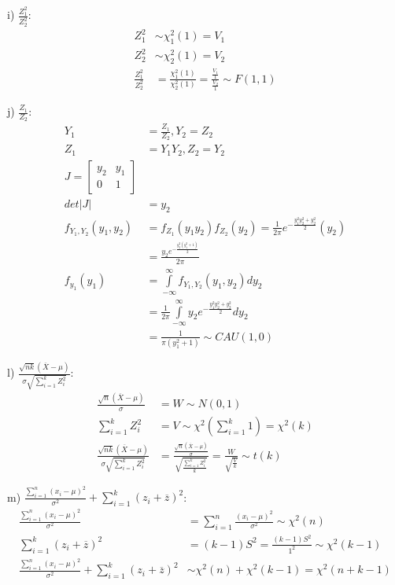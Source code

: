 i) $\frac{Z^2_1}{Z^2_2}$:
\begin{align*}
Z^2_1 &\sim \chi^2_1(1) = V_1 \\
Z^2_2 &\sim \chi^2_2(1) = V_2 \\
\frac{Z^2_1}{Z^2_2} &= \frac{\chi^2_1(1)}{\chi^2_2(1)} = \frac{\frac{V_1}{1}}{\frac{V_2}{1}} \sim F(1, 1)
\end{align*}

j) $\frac{Z_1}{Z_2}$:
\begin{align*}
Y_1 &= \frac{Z_1}{Z_2}, Y_2 = Z_2 \\
Z_1 &= Y_1 Y_2, Z_2 = Y_2 \\
J=\left[
\begin{matrix}
y_2  & y_1 \\
0     & 1
\end{matrix}
\right] \\
det |J| &= y_2 \\
f_{Y_1, Y_2}(y_1, y_2) &= f_{Z_1}(y_1 y_2) f_{Z_2}(y_2) = \frac{1}{2 \pi} e^{-\frac{y^2_1 y^2_2 + y^2_2}{2}} (y_2) \\
  &= \frac{y_2 e^{-\frac{y^2_2(y^2_1 + 1)}{2}}}{2 \pi} \\
f_{y_1}(y_1) &= \int\limits^{\infty}_{-\infty} f_{Y_1, Y_2}(y_1, y_2) dy_2 \\
  &= \frac{1}{2 \pi} \int\limits^{\infty}_{-\infty} y_2 e^{-\frac{y^2_1 y^2_2 + y^2_2}{2}} dy_2 \\
  &= \frac{1}{\pi \left(y^2_1 + 1\right)} \sim CAU(1, 0)
\end{align*}

l) $\frac{\sqrt{nk}\left(\overline{X}-\mu\right)}{\sigma \sqrt{\sum\limits^k_{i=1} Z^2_i}}$:
\begin{align*}
\frac{\sqrt{n}\left(\overline{X}-\mu\right)}{\sigma} &= W \sim N(0, 1) \\
\sum\limits^k_{i=1} Z^2_i &= V \sim \chi^2\left(\sum\limits^k_{i=1} 1\right) = \chi^2(k) \\
\frac{\sqrt{nk}\left(\overline{X}-\mu\right)}{\sigma \sqrt{\sum\limits^k_{i=1} Z^2_i}} &=
  \frac{ \frac{\sqrt{n}\left(\overline{X}-\mu\right)}{\sigma} }{ \sqrt{\frac{\sum\limits^k_{i=1} Z^2_i}{k}} } = \frac{W}{\sqrt{\frac{V}{k}}} \sim t(k)
\end{align*}

m) $\frac{\sum\limits^n_{i=1} \left(x_i - \mu\right)^2}{\sigma^2} + \sum\limits^k_{i=1}\left(z_i + \overline{z}\right)^2$:
\begin{align*}
\frac{\sum\limits^n_{i=1} (x_i - \mu)^2}{\sigma^2} &= \sum\limits^n_{i=1}  \frac{(x_i - \mu)^2}{\sigma^2} \sim \chi^2(n) \\
\sum\limits^k_{i=1}\left(z_i + \overline{z}\right)^2 &= (k-1) S^2 = \frac{(k-1) S^2}{1^2} \sim \chi^2(k-1) \\
\frac{\sum\limits^n_{i=1} \left(x_i - \mu\right)^2}{\sigma^2} + \sum\limits^k_{i=1}\left(z_i + \overline{z}\right)^2 &\sim \chi^2(n) + \chi^2(k-1) = \chi^2(n+k-1)
\end{align*}

